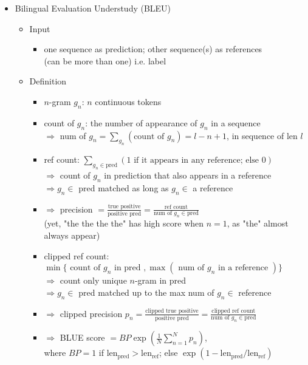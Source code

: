 \begin{itemize}
\begin{itemize}
\begin{itemize}
		\end{itemize}
	\end{itemize}
\item Bilingual Evaluation Understudy (BLEU)
	\begin{itemize}
	\item Input
		\begin{itemize}
		\item one sequence as prediction; other sequence(s) as references \\ 
		(can be more than one) i.e. label
		\end{itemize}
	\item Definition
		\begin{itemize}
		\item $n$-gram $g_n$: $n$ continuous tokens
		\item count of $g_n$: the number of appearance of $g_n$ in a sequence \\
		$\Rightarrow$ num of $g_n \displaystyle =\sum_{g_n} (\text{count of }g_n) = l-n+1$, in sequence of len $l$
		\item ref count: $\displaystyle \sum_{g_n\in\text{pred}} (1 \text{ if it appears in any reference; else } 0)$ \\
		$\Rightarrow$ count of $g_n$ in prediction that also appears in a reference \\
		$\Rightarrow g_n\in$ pred matched as long as $g_n\in$ a reference
		\item $\Rightarrow$ precision $\displaystyle = \frac {\text{true positive}} {\text{positive pred}} = \frac {\text{ref count}} {\text{num of }g_n\in \text{pred}}$\\
		(yet, "the the the the" has high score when $n=1$, as "the" almost always appear)	
		\item clipped ref count: $\displaystyle \min\{ \text{ count of }g_n \text{ in pred }, \max(\text{ num of }g_n\text{ in a reference }) \}$ \\
		$\Rightarrow$ count only unique $n$-gram in pred \\
		$\Rightarrow g_n\in$ pred matched up to the max num of $g_n\in$ reference
		\item $\Rightarrow$ clipped precision $\displaystyle p_n = \frac {\text{clipped true positive}}{\text{positive pred}} = \frac {\text{clipped ref count}} {\text{num of }g_n \in \text{pred}}$
		\item $\Rightarrow$ BLUE score $\displaystyle = BP\exp\left(\frac 1N \sum_{n=1}^N p_n\right)$, \\
		where $BP=1$ if $\text{len}_\text{pred}>\text{len}_\text{ref}$; else $\exp(1-\text{len}_\text{pred}/\text{len}_\text{ref})$ \\

\end{itemize}
\end{itemize}
\end{itemize}
